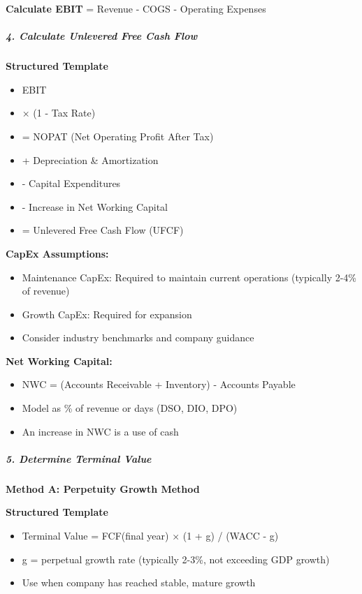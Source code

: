 \documentclass[11pt]{article}
\begin{document}
\textbf{Calculate EBIT} = Revenue - COGS - Operating Expenses


\subparagraph{4. Calculate Unlevered Free Cash Flow}\mbox{}\par
\textbf{Structured Template}
\begin{itemize}[leftmargin=*,itemsep=2pt,topsep=2pt]
\item {} EBIT
\item {} × (1 - Tax Rate)
\item {} = NOPAT (Net Operating Profit After Tax)
\item {} + Depreciation \& Amortization
\item {} - Capital Expenditures
\item {} - Increase in Net Working Capital
\item {} = Unlevered Free Cash Flow (UFCF)
\end{itemize}

\textbf{CapEx Assumptions:}

\begin{itemize}[leftmargin=*,itemsep=2pt,topsep=2pt]
\item {} Maintenance CapEx: Required to maintain current operations (typically 2-4\% of revenue)
\item {} Growth CapEx: Required for expansion
\item {} Consider industry benchmarks and company guidance
\end{itemize}

\textbf{Net Working Capital:}

\begin{itemize}[leftmargin=*,itemsep=2pt,topsep=2pt]
\item {} NWC = (Accounts Receivable + Inventory) - Accounts Payable
\item {} Model as \% of revenue or days (DSO, DIO, DPO)
\item {} An increase in NWC is a use of cash
\end{itemize}

\subparagraph{5. Determine Terminal Value}\mbox{}\par

\textbf{Method A: Perpetuity Growth Method}

\textbf{Structured Template}
\begin{itemize}[leftmargin=*,itemsep=2pt,topsep=2pt]
\item {} Terminal Value = FCF(final year) × (1 + g) / (WACC - g)
\end{itemize}
\begin{itemize}[leftmargin=*,itemsep=2pt,topsep=2pt]
\item {} g = perpetual growth rate (typically 2-3\%, not exceeding GDP growth)
\item {} Use when company has reached stable, mature growth
\end{itemize}
\end{document}
